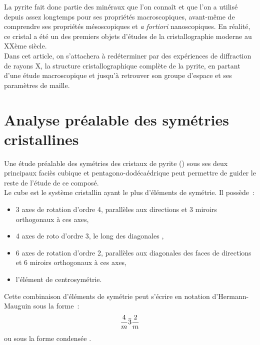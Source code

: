 La pyrite fait donc partie des minéraux que l'on connaît et que l'on a utilisé depuis assez longtemps pour ses propriétés macroscopiques, avant-même de comprendre ses propriétés mésoscopiques et \textit{a fortiori} nanoscopiques.
En réalité, ce cristal a été un des premiers objets d'études de la cristallographie moderne au XXème siècle.\\
Dans cet article, on s'attachera à redéterminer par des expériences de diffraction de rayons X, la structure cristallographique complète de la pyrite, en partant d'une étude macroscopique et jusqu'à retrouver son groupe d'espace et ses paramètres de maille.

\section{Analyse préalable des symétries cristallines}

Une étude préalable des symétries des cristaux de pyrite () sous ses deux principaux faciès cubique et pentagono-dodécaédrique peut permettre de guider le reste de l'étude de ce composé.\\
Le cube est le système cristallin ayant le plus d'éléments de symétrie. Il possède~:
\begin{itemize}
    \item 3 axes de rotation d'ordre 4, parallèles aux directions  et 3 miroirs orthogonaux à ces axes,
    \item 4 axes de roto d'ordre 3, le long des diagonales ,
    \item 6 axes de rotation d'ordre 2, parallèles aux diagonales des faces de directions  et 6 miroirs orthogonaux à ces axes,
    \item l'élément de centrosymétrie.
\end{itemize}
Cette combinaison d'éléments de symétrie peut s'écrire en notation d'Hermann-Mauguin sous la forme~:
\[
\hmn{*4 -3 *2}
\]
ou sous la forme condensée .

